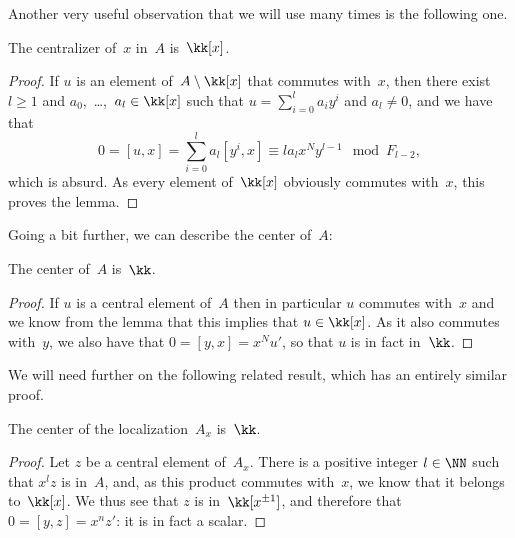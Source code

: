 Another very useful observation that we will use many times is the
following one.

\begin{Lemma}\label{lemma:centralizer:x}
The centralizer of~$x$ in~$A$ is~$\kk[x]$.
\end{Lemma}

\begin{proof}
If $u$ is an element of~$A\setminus\kk[x]$ that commutes with~$x$, then
there exist $l\geq1$ and $a_0$,~\dots,~$a_l\in\kk[x]$ such that
$u=\sum_{i=0}^la_iy^i$ and $a_l\neq0$, and we have that
  \[
  0 = [u,x] = \sum_{i=0}^la_l[y^i,x]
        \equiv la_lx^Ny^{l-1} \mod F_{l-2},
  \]
which is absurd. As every element of~$\kk[x]$ obviously commutes with~$x$,
this proves the lemma.
\end{proof}

Going a bit further, we can describe the center of~$A$:

\begin{Proposition}\label{prop:center}
The center of~$A$ is~$\kk$.
\end{Proposition}

\begin{proof}
If $u$ is a central element of~$A$ then in particular $u$ commutes with~$x$
and we know from the lemma that this implies that $u\in\kk[x]$. As it also
commutes with~$y$, we also have that $0=[y,x]=x^Nu'$, so that $u$ is in
fact in~$\kk$.
\end{proof}

We will need further on the following related result, which has an entirely
similar proof.

\begin{Proposition}\label{prop:center:x}
The center of the localization~$A_x$ is~$\kk$.
\end{Proposition}

\begin{proof}
Let $z$ be a central element of~$A_x$. There is a positive integer
$l\in\NN$ such that $x^lz$ is in~$A$, and, as this product commutes
with~$x$, we know that it belongs to~$\kk[x]$. We thus see that $z$ is
in~$\kk[x^{\pm1}]$, and therefore that $0=[y,z]=x^nz'$: it is in fact a
scalar.
\end{proof}

